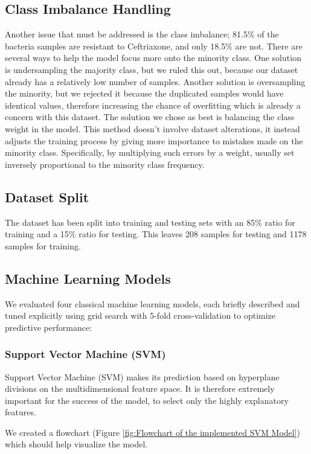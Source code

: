 \documentclass{article}
\begin{document}
\subsection{Class Imbalance Handling}
Another issue that must be addressed is the class imbalance; 81.5\% of the bacteria samples are resistant to Ceftriaxone, and only 18.5\% are not. There are several ways to help the model focus more onto the minority class. One solution is undersampling the majority class, but we ruled this out, because our dataset already has a relatively low number of samples. Another solution is oversampling the minority, but we rejected it because the duplicated samples would have identical values, therefore increasing the chance of overfitting which is already a concern with this dataset. The solution we chose as best is balancing the class weight in the model. This method doesn't involve dataset alterations, it instead adjusts the training process by giving more importance to mistakes made on the minority class. Specifically, by multiplying such errors by a weight, usually set inversely proportional to the minority class frequency.

\subsection{Dataset Split}

The dataset has been split into training and testing sets with an 85\% ratio for training and a 15\% ratio for testing. This leaves 208 samples for testing and 1178 samples for training.

\subsection{Machine Learning Models}

We evaluated four classical machine learning models, each briefly described and tuned explicitly using grid search with 5-fold cross-validation to optimize predictive performance:

\subsubsection{Support Vector Machine (SVM)}
Support Vector Machine (SVM) makes its prediction based on hyperplane divisions on the multidimensional feature space. It is therefore extremely important for the success of the model, to select only the highly explanatory features. 

We created a flowchart (Figure \ref{fig:Flowchart of the implemented SVM Model}) which should help visualize the model.
\end{document}
